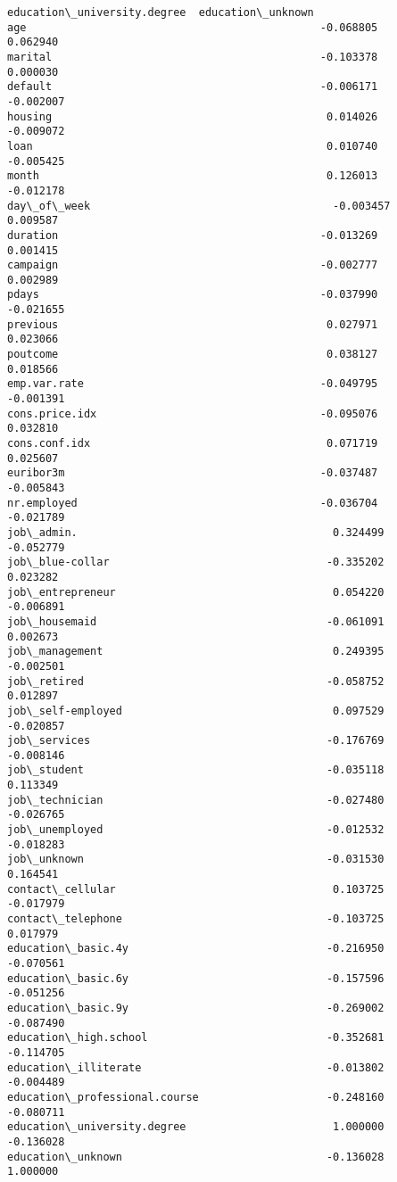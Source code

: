 \documentclass[11pt]{article}
\begin{document}
\begin{tcolorbox}[breakable, size=fbox, boxrule=.5pt, pad at break*=1mm, opacityfill=0]
\begin{Verbatim}[commandchars=\\\{\}]
                               education\_university.degree  education\_unknown
age                                              -0.068805           0.062940
marital                                          -0.103378           0.000030
default                                          -0.006171          -0.002007
housing                                           0.014026          -0.009072
loan                                              0.010740          -0.005425
month                                             0.126013          -0.012178
day\_of\_week                                      -0.003457           0.009587
duration                                         -0.013269           0.001415
campaign                                         -0.002777           0.002989
pdays                                            -0.037990          -0.021655
previous                                          0.027971           0.023066
poutcome                                          0.038127           0.018566
emp.var.rate                                     -0.049795          -0.001391
cons.price.idx                                   -0.095076           0.032810
cons.conf.idx                                     0.071719           0.025607
euribor3m                                        -0.037487          -0.005843
nr.employed                                      -0.036704          -0.021789
job\_admin.                                        0.324499          -0.052779
job\_blue-collar                                  -0.335202           0.023282
job\_entrepreneur                                  0.054220          -0.006891
job\_housemaid                                    -0.061091           0.002673
job\_management                                    0.249395          -0.002501
job\_retired                                      -0.058752           0.012897
job\_self-employed                                 0.097529          -0.020857
job\_services                                     -0.176769          -0.008146
job\_student                                      -0.035118           0.113349
job\_technician                                   -0.027480          -0.026765
job\_unemployed                                   -0.012532          -0.018283
job\_unknown                                      -0.031530           0.164541
contact\_cellular                                  0.103725          -0.017979
contact\_telephone                                -0.103725           0.017979
education\_basic.4y                               -0.216950          -0.070561
education\_basic.6y                               -0.157596          -0.051256
education\_basic.9y                               -0.269002          -0.087490
education\_high.school                            -0.352681          -0.114705
education\_illiterate                             -0.013802          -0.004489
education\_professional.course                    -0.248160          -0.080711
education\_university.degree                       1.000000          -0.136028
education\_unknown                                -0.136028           1.000000


\end{Verbatim}
\end{tcolorbox}
\end{document}
